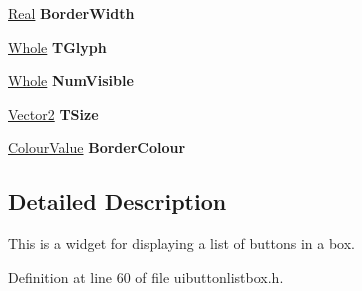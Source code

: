 \begin{DoxyCompactItemize}
\item 
\hypertarget{classphys_1_1UI_1_1ButtonListBox_a84d6d689a273e77252f248c81bd1d670}{
\hyperlink{namespacephys_af7eb897198d265b8e868f45240230d5f}{Real} {\bfseries BorderWidth}}
\label{d4/dd7/classphys_1_1UI_1_1ButtonListBox_a84d6d689a273e77252f248c81bd1d670}

\item 
\hypertarget{classphys_1_1UI_1_1ButtonListBox_a4284fcee343ce2bbb178d560a5712e6b}{
\hyperlink{namespacephys_a460f6bc24c8dd347b05e0366ae34f34a}{Whole} {\bfseries TGlyph}}
\label{d4/dd7/classphys_1_1UI_1_1ButtonListBox_a4284fcee343ce2bbb178d560a5712e6b}

\item 
\hypertarget{classphys_1_1UI_1_1ButtonListBox_a9414e2009038dcd9dbb31464f63b563a}{
\hyperlink{namespacephys_a460f6bc24c8dd347b05e0366ae34f34a}{Whole} {\bfseries NumVisible}}
\label{d4/dd7/classphys_1_1UI_1_1ButtonListBox_a9414e2009038dcd9dbb31464f63b563a}

\item 
\hypertarget{classphys_1_1UI_1_1ButtonListBox_a3b2483012699ef522c592ecefb30a82a}{
\hyperlink{classphys_1_1Vector2}{Vector2} {\bfseries TSize}}
\label{d4/dd7/classphys_1_1UI_1_1ButtonListBox_a3b2483012699ef522c592ecefb30a82a}

\item 
\hypertarget{classphys_1_1UI_1_1ButtonListBox_abea496f1f59230f00ea03af54264804b}{
\hyperlink{classphys_1_1ColourValue}{ColourValue} {\bfseries BorderColour}}
\label{d4/dd7/classphys_1_1UI_1_1ButtonListBox_abea496f1f59230f00ea03af54264804b}

\end{DoxyCompactItemize}


\subsection{Detailed Description}
This is a widget for displaying a list of buttons in a box. 

Definition at line 60 of file uibuttonlistbox.h.



